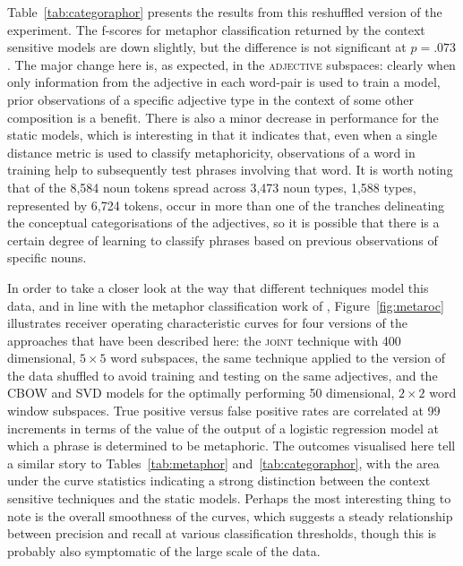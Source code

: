 Table~\ref{tab:categoraphor} presents the results from this reshuffled version of the experiment.  The f-scores for metaphor classification returned by the context sensitive models are down slightly, but the difference is not significant at $p = .073$.  The major change here is, as expected, in the \textsc{adjective} subspaces: clearly when only information from the adjective in each word-pair is used to train a model, prior observations of a specific adjective type in the context of some other composition is a benefit.  There is also a minor decrease in performance for the static models, which is interesting in that it indicates that, even when a single distance metric is used to classify metaphoricity, observations of a word in training help to subsequently test phrases involving that word.  It is worth noting that of the 8,584 noun tokens spread across 3,473 noun types, 1,588 types, represented by 6,724 tokens, occur in more than one of the tranches delineating the conceptual categorisations of the adjectives, so it is possible that there is a certain degree of learning to classify phrases based on previous observations of specific nouns.

In order to take a closer look at the way that different techniques model this data, and in line with the metaphor classification work of \cite{TsvetkovEA2014}, Figure~\ref{fig:metaroc} illustrates receiver operating characteristic curves for four versions of the approaches that have been described here: the \textsc{joint} technique with 400 dimensional, $5 \times 5$ word subspaces, the same technique applied to the version of the data shuffled to avoid training and testing on the same adjectives, and the CBOW and SVD models for the optimally performing 50 dimensional, $2 \times 2$ word window subspaces.  True positive versus false positive rates are correlated at 99 increments in terms of the value of the output of a logistic regression model at which a phrase is determined to be metaphoric.  The outcomes visualised here tell a similar story to Tables~\ref{tab:metaphor} and~\ref{tab:categoraphor}, with the area under the curve statistics indicating a strong distinction between the context sensitive techniques and the static models.  Perhaps the most interesting thing to note is the overall smoothness of the curves, which suggests a steady relationship between precision and recall at various classification thresholds, though this is probably also symptomatic of the large scale of the data.

